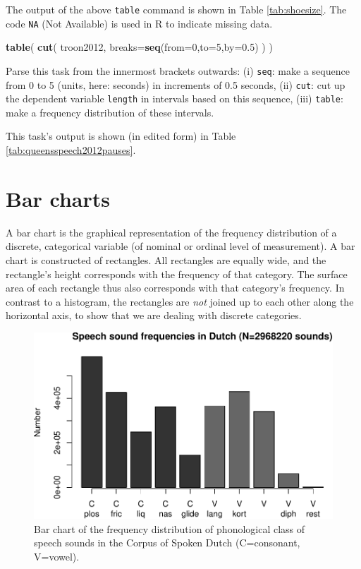 \documentclass[
]{book}
\newenvironment{Shaded}{\begin{snugshade}}{\end{snugshade}}
\newcommand{\AttributeTok}[1]{\textcolor[rgb]{0.13,0.29,0.53}{#1}}
\newcommand{\DecValTok}[1]{\textcolor[rgb]{0.00,0.00,0.81}{#1}}
\newcommand{\FloatTok}[1]{\textcolor[rgb]{0.00,0.00,0.81}{#1}}
\newcommand{\FunctionTok}[1]{\textcolor[rgb]{0.13,0.29,0.53}{\textbf{#1}}}
\newcommand{\NormalTok}[1]{#1}
\begin{document}
The output of the above \texttt{table} command is shown in Table \ref{tab:shoesize}.
The code \texttt{NA} (Not Available) is used in R to indicate missing data.

\begin{Shaded}
\begin{Highlighting}[]
\FunctionTok{table}\NormalTok{( }\FunctionTok{cut}\NormalTok{( troon2012, }\AttributeTok{breaks=}\FunctionTok{seq}\NormalTok{(}\AttributeTok{from=}\DecValTok{0}\NormalTok{,}\AttributeTok{to=}\DecValTok{5}\NormalTok{,}\AttributeTok{by=}\FloatTok{0.5}\NormalTok{) ) )}
\end{Highlighting}
\end{Shaded}

Parse this task from the innermost brackets outwards:
(i) \texttt{seq}: make a sequence from 0 to 5 (units, here: seconds) in increments of 0.5 seconds,
(ii) \texttt{cut}: cut up the dependent variable \texttt{length} in intervals based on this sequence,
(iii) \texttt{table}: make a frequency distribution of these intervals.

This task's output is shown (in edited form) in Table \ref{tab:queensspeech2012pauses}.

\hypertarget{sec:barcharts}{%
\section{Bar charts}\label{sec:barcharts}}

A bar chart is the graphical representation of the
frequency distribution of a discrete, categorical variable (of
nominal or ordinal level of measurement). A bar chart is constructed
of rectangles. All rectangles are equally wide, and the
rectangle's height corresponds with the frequency of that category. The
surface area of each rectangle thus also corresponds with that category's frequency.
In contrast to a histogram, the rectangles are \emph{not}
joined up to each other along the horizontal axis, to
show that we are dealing with discrete categories.

\begin{figure}
\centering
\includegraphics{QMS-EN_files/figure-latex/klankfreq-barplot-1.pdf}
\caption{\label{fig:klankfreq-barplot}Bar chart of the frequency distribution of phonological class of speech sounds in the Corpus of Spoken Dutch (C=consonant, V=vowel).}
\end{figure}
\end{document}
